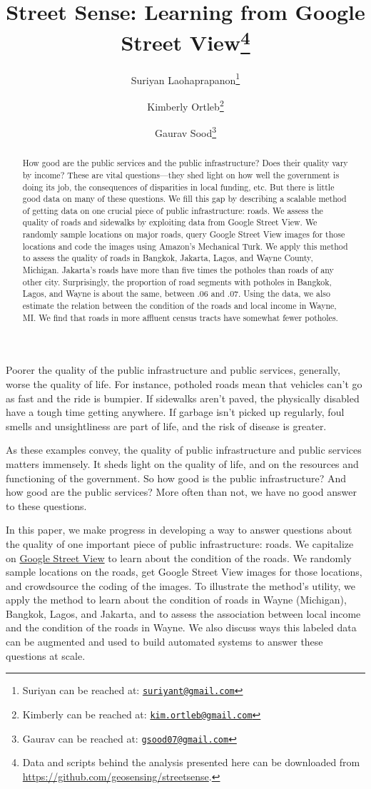 \documentclass[12pt, letterpaper]{article}
\title{Street Sense: Learning from Google Street View\footnote{Data and scripts behind the analysis presented here can be downloaded from \url{https://github.com/geosensing/streetsense}.
}}
\author{Suriyan Laohaprapanon\thanks{Suriyan can be reached at: \href{mailto:suriyant@gmail.com}{\texttt{suriyant@gmail.com}}} \and Kimberly Ortleb\thanks{Kimberly can be reached at: \href{kim.ortleb@gmail.com}{\texttt{kim.ortleb@gmail.com}}} \and Gaurav Sood\thanks{Gaurav can be reached at: \href{gsood07@gmail.com}{\texttt{gsood07@gmail.com}}}}
\begin{document}
\maketitle
\thispagestyle{empty}

\begin{abstract}
How good are the public services and the public infrastructure? Does their quality vary by income? These are vital questions---they shed light on how well the government is doing its job, the consequences of disparities in local funding, etc. But there is little good data on many of these questions. We fill this gap by describing a scalable method of getting data on one crucial piece of public infrastructure: roads. We assess the quality of roads and sidewalks by exploiting data from Google Street View. We randomly sample locations on major roads, query Google Street View images for those locations and code the images using Amazon's Mechanical Turk. We apply this method to assess the quality of roads in Bangkok, Jakarta, Lagos, and Wayne County, Michigan. Jakarta's roads have more than five times the potholes than roads of any other city. Surprisingly, the proportion of road segments with potholes in Bangkok, Lagos, and Wayne is about the same, between .06 and .07. Using the data, we also estimate the relation between the condition of the roads and local income in Wayne, MI. We find that roads in more affluent census tracts have somewhat fewer potholes.
\end{abstract}

\clearpage

\doublespacing

Poorer the quality of the public infrastructure and public services, generally, worse the quality of life. For instance, potholed roads mean that vehicles can't go as fast and the ride is bumpier. If sidewalks aren't paved, the physically disabled have a tough time getting anywhere. If garbage isn't picked up regularly, foul smells and unsightliness are part of life, and the risk of disease is greater.  

As these examples convey, the quality of public infrastructure and public services matters immensely. It sheds light on the quality of life, and on the resources and functioning of the government. So how good is the public infrastructure? And how good are the public services? More often than not, we have no good answer to these questions.

In this paper, we make progress in developing a way to answer questions about the quality of one important piece of public infrastructure: roads. We capitalize on \href{https://www.google.com/streetview/}{Google Street View} to learn about the condition of the roads. We randomly sample locations on the roads, get Google Street View images for those locations, and crowdsource the coding of the images. To illustrate the method's utility, we apply the method to learn about the condition of roads in Wayne (Michigan), Bangkok, Lagos, and Jakarta, and to assess the association between local income and the condition of the roads in Wayne. We also discuss ways this labeled data can be augmented and used to build automated systems to answer these questions at scale.
\end{document}
